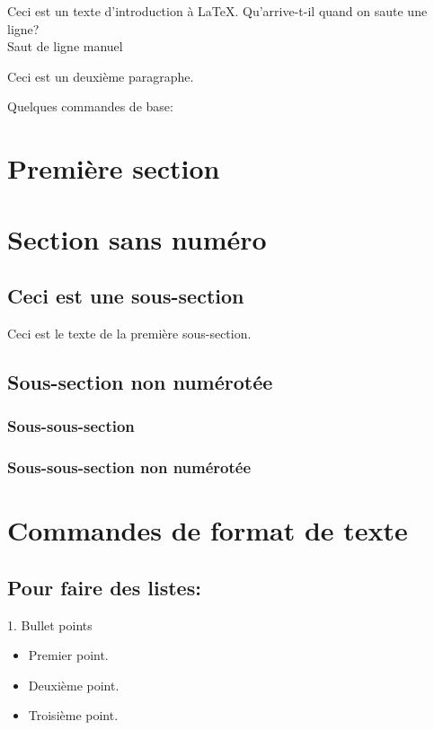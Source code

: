 \documentclass[letterpaper, french, 12pt]{article} %
\numberwithin{equation}{section}
\numberwithin{figure}{section}
\begin{document}
Ceci est un texte d'introduction à LaTeX.
Qu'arrive-t-il quand on saute une ligne?\\
Saut de ligne manuel

Ceci est un deuxième paragraphe.

Quelques commandes de base:

\section{Première section} %
\section*{Section sans numéro} %

\subsection{Ceci est une sous-section}
Ceci est le texte de la première sous-section.

\subsection*{Sous-section non numérotée}

\subsubsection{Sous-sous-section}
\subsubsection*{Sous-sous-section non numérotée}

\section{Commandes de format de texte}
\subsection{Pour faire des listes:}

1. Bullet points
\begin{itemize}
    \item Premier point.
    \item Deuxième point.
    \item Troisième point.
\end{itemize}
\end{document}
